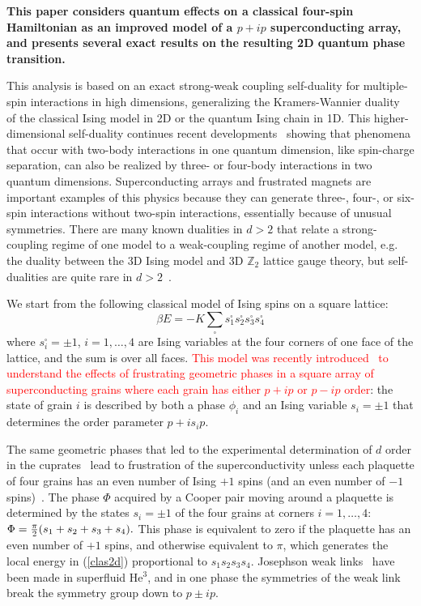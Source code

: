 \documentclass[prl,twocolumn,showpacs,superscriptaddress,preprintnumbers,amssymb]{revtex4}
\newcommand{\beq}{\begin{equation}}
\newcommand{\eeq}{\end{equation}}
\begin{document}
\textbf{This paper considers quantum effects on a classical four-spin
Hamiltonian as an improved model of a $p+ip$ superconducting array,
and presents several exact results on the resulting 2D quantum phase
transition.}

This analysis is based on an exact strong-weak
coupling self-duality for multiple-spin interactions in high
dimensions, generalizing the Kramers-Wannier
duality~\cite{kramerswannier} of the classical Ising model in 2D
or the quantum Ising chain in 1D.  This higher-dimensional
self-duality continues recent developments~\cite{moessnersondhi,paramekanti} showing that phenomena that occur with two-body interactions in one quantum
dimension, like spin-charge separation, can also be realized by
three- or four-body interactions in two quantum dimensions.  Superconducting
arrays and frustrated magnets are important examples of this physics because they can generate three-, four-, or six-spin interactions without two-spin interactions, essentially because of unusual symmetries.  There are many known dualities in $d>2$ that
relate a strong-coupling regime of one model to a weak-coupling
regime of another model, e.g. the duality between the 3D Ising
model and 3D $\mathbb{Z}_2$ lattice gauge theory, but self-dualities
are quite rare in $d>2$~\cite{savit2}.

We start from the following classical model of Ising spins on a
square lattice: \beq \beta E = -K \sum_\square s^\square_1
s^\square_2 s^\square_3 s^\square_4 \label{clas2d} \eeq where
$s^\square_i = \pm 1$, $i=1,\ldots,4$ are Ising variables at the
four corners of one face of the lattice, and the sum is over all
faces.  \textcolor{red}{This model was recently introduced~\cite{moorelee} to
understand the effects of frustrating geometric phases in a square
array of superconducting grains where each grain has either $p+ip$
or $p-ip$ order}: the state of grain $i$ is described by both a
phase $\phi_i$ and an Ising variable $s_i = \pm 1$ that
determines the order parameter $p + i s_i p$.

The same geometric phases that led to the experimental determination of $d$
order in the cuprates~\cite{vanharlingen,tsuei} lead to
frustration of the superconductivity unless each plaquette of four
grains has an even number of Ising $+1$ spins (and an even
number of $-1$ spins)~\cite{moorelee}.  The phase $\Phi$ acquired by a Cooper pair moving around a plaquette is determined
by the states $s_i = \pm 1$ of the four grains at corners $i=1, \ldots, 4$: $\Phi = {\pi \over 2} (s_1 + s_2 + s_3 + s_4).$
This phase is equivalent to zero if the plaquette has an even number of $+1$ spins, and otherwise equivalent to $\pi$, which generates the local energy in (\ref{clas2d}) proportional to $s_1 s_2 s_3 s_4$.  Josephson weak links~\cite{davispackard} have been made in superfluid He$^3$, and
in one phase the symmetries of the weak link break the
symmetry group down to $p\pm ip$.
\end{document}
